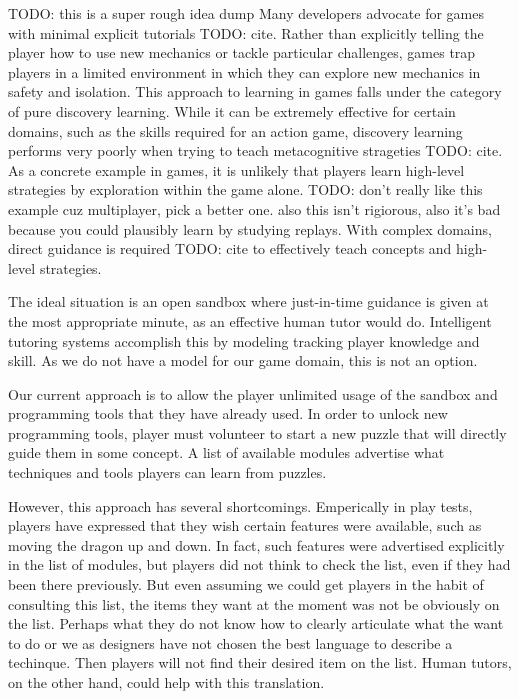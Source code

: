 \documentclass{sig-alternate}
\newcommand{\TODO}[1]{{\color{red} TODO: #1}}
\begin{document}
\TODO{this is a super rough idea dump}
Many developers advocate for games with minimal explicit tutorials \TODO{cite}.
Rather than explicitly telling the player how to use new mechanics or tackle particular challenges, games trap players in a limited environment in which they can explore new mechanics in safety and isolation.
This approach to learning in games falls under the category of pure discovery learning.
While it can be extremely effective for certain domains, such as the skills required for an action game, discovery learning performs very poorly when trying to teach metacognitive strageties \TODO{cite}.
As a concrete example in games, it is unlikely that players learn high-level strategies by exploration within the game alone. \TODO{don't really like this example cuz multiplayer, pick a better one. also this isn't rigiorous, also it's bad because you could plausibly learn by studying replays}.
With complex domains, direct guidance is required \TODO{cite} to effectively teach concepts and high-level strategies.

The ideal situation is an open sandbox where just-in-time guidance is given at the most appropriate minute, as an effective human tutor would do.
Intelligent tutoring systems accomplish this by modeling tracking player knowledge and skill.
As we do not have a model for our game domain, this is not an option.

Our current approach is to allow the player unlimited usage of the sandbox and programming tools that they have already used.
In order to unlock new programming tools, player must volunteer to start a new puzzle that will directly guide them in some concept.
A list of available modules advertise what techniques and tools players can learn from puzzles.

However, this approach has several shortcomings.
Emperically in play tests, players have expressed that they wish certain features were available, such as moving the dragon up and down.
In fact, such features were advertised explicitly in the list of modules, but players did not think to check the list, even if they had been there previously.
But even assuming we could get players in the habit of consulting this list, the items they want at the moment was not be obviously on the list.
Perhaps what they do not know how to clearly articulate what the want to do or we as designers have not chosen the best language to describe a techinque.
Then players will not find their desired item on the list.
Human tutors, on the other hand, could help with this translation.
\end{document}
